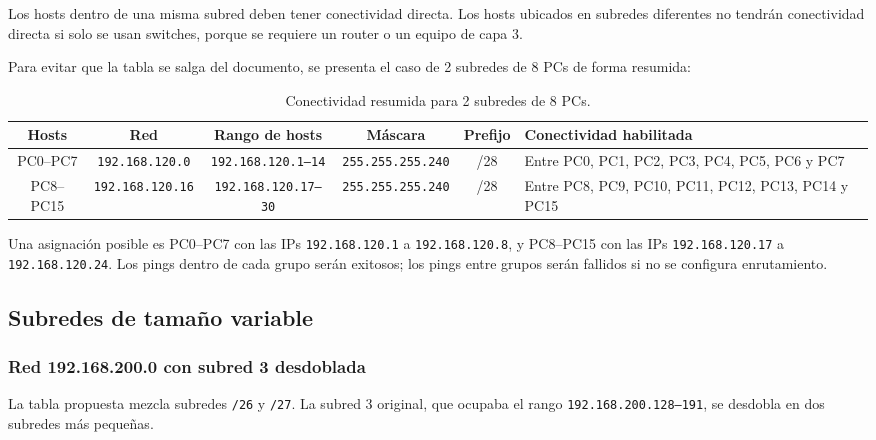 \documentclass[a4paper,12pt]{article}
\newcommand{\ip}[1]{\mbox{\texttt{#1}}}
\begin{document}
Los hosts dentro de una misma subred deben tener conectividad directa. Los hosts ubicados en subredes diferentes no tendrán conectividad directa si solo se usan switches, porque se requiere un router o un equipo de capa 3.

Para evitar que la tabla se salga del documento, se presenta el caso de 2 subredes de 8 PCs de forma resumida:

\begin{table}[H]
\centering
\scriptsize
\begin{tabular}{|c|c|c|c|c|p{3.3cm}|}
\hline
Hosts & Red & Rango de hosts & Máscara & Prefijo & Conectividad habilitada \\
\hline
PC0--PC7 & \ip{192.168.120.0} & \ip{192.168.120.1--14} & \ip{255.255.255.240} & /28 & Entre PC0, PC1, PC2, PC3, PC4, PC5, PC6 y PC7 \\
PC8--PC15 & \ip{192.168.120.16} & \ip{192.168.120.17--30} & \ip{255.255.255.240} & /28 & Entre PC8, PC9, PC10, PC11, PC12, PC13, PC14 y PC15 \\
\hline
\end{tabular}
\caption{Conectividad resumida para 2 subredes de 8 PCs.}
\end{table}

Una asignación posible es PC0--PC7 con las IPs \ip{192.168.120.1} a \ip{192.168.120.8}, y PC8--PC15 con las IPs \ip{192.168.120.17} a \ip{192.168.120.24}. Los pings dentro de cada grupo serán exitosos; los pings entre grupos serán fallidos si no se configura enrutamiento.


\subsection{Subredes de tamaño variable}

\subsubsection{Red 192.168.200.0 con subred 3 desdoblada}

La tabla propuesta mezcla subredes \ip{/26} y \ip{/27}. La subred 3 original, que ocupaba el rango \ip{192.168.200.128--191}, se desdobla en dos subredes más pequeñas.
\end{document}
